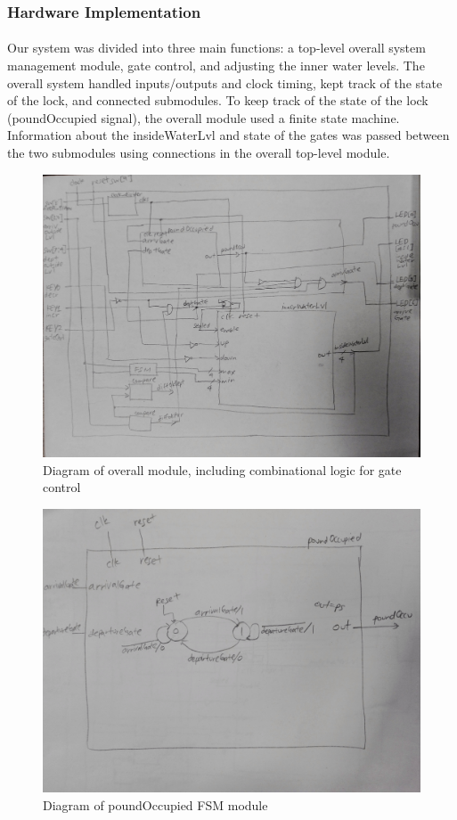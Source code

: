 \documentclass{article}
\begin{document}
		\subsubsection{Hardware Implementation}
      \paragraph{} Our system was divided into three main functions: a top-level overall system management module, gate control, and adjusting the inner water levels. The overall system handled inputs/outputs and clock timing, kept track of the state of the lock, and connected submodules. To keep track of the state of the lock (poundOccupied signal), the overall module used a finite state machine. Information about the insideWaterLvl and state of the gates was passed between the two submodules using connections in the overall top-level module.

      \begin{figure}[H]
        \centering
        \includegraphics[width=0.75\linewidth]{figures/block_diagrams/overall_diagram.jpeg}
        \caption{Diagram of overall module, including combinational logic for gate control}
        \label{fig:overall_diagram}
      \end{figure}

      \begin{figure}[H]
        \centering
        \includegraphics[width=0.75\linewidth]{figures/block_diagrams/poundOccupied_diagram.jpeg}
        \caption{Diagram of poundOccupied FSM module}
        \label{fig:poundOccupied_diagram}
      \end{figure}
\end{document}
